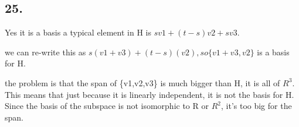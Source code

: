 \documentclass[12]{scrartcl}
\begin{document}
\subsection*{25.}
Yes it is a basis a typical element in H is $sv1 + (t-s)v2 + sv3$. 

we can re-write this as $s(v1+v3) + (t-s)(v2), so \{v1+v3,v2\}$ is a basis for H. 

the problem is that the span of \{v1,v2,v3\} is much bigger than H, it is all of $R^3$. 
This means that just because it is linearly independent, it is not the basis for H. Since the basis of the subspace is not isomorphic to R or $R^2$, it's too big for the span. 
\end{document}
